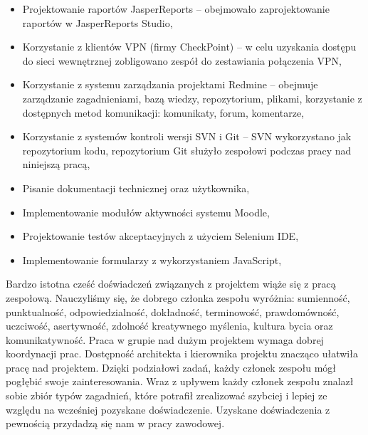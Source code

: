 \begin{itemize}
\item Projektowanie raportów JasperReports -- obejmowało zaprojektowanie raportów w JasperReports Studio,
\item Korzystanie z klientów VPN (firmy CheckPoint) -- w celu uzyskania dostępu do sieci wewnętrznej zobligowano zespół do zestawiania połączenia VPN,
\item Korzystanie z systemu zarządzania projektami Redmine -- obejmuje zarządzanie zagadnieniami, bazą wiedzy, repozytorium, plikami, korzystanie z dostępnych metod komunikacji: komunikaty, forum, komentarze,
\item Korzystanie z systemów kontroli wersji SVN i Git -- SVN wykorzystano jak repozytorium kodu, repozytorium Git służyło zespołowi podczas pracy nad niniejszą pracą,
\item Pisanie dokumentacji technicznej oraz użytkownika,
\item Implementowanie modułów aktywności systemu Moodle,
\item Projektowanie testów akceptacyjnych z użyciem Selenium IDE,
\item Implementowanie formularzy z wykorzystaniem JavaScript,
\end{itemize}

Bardzo istotna cześć doświadczeń związanych z projektem wiąże się z pracą zespołową.
Nauczyliśmy się, że dobrego członka zespołu wyróżnia: sumienność, punktualność, odpowiedzialność, dokładność, terminowość, prawdomówność, uczciwość, asertywność, zdolność kreatywnego myślenia, kultura bycia oraz komunikatywność. Praca w grupie nad dużym projektem wymaga dobrej koordynacji prac. Dostępność architekta i kierownika projektu znacząco ułatwiła pracę nad projektem. Dzięki podziałowi zadań, każdy członek zespołu mógł pogłębić swoje zainteresowania. Wraz z upływem każdy członek zespołu znalazł sobie zbiór typów zagadnień, które potrafił zrealizować szybciej i lepiej ze względu na wcześniej pozyskane doświadczenie. Uzyskane doświadczenia z pewnością przydadzą się nam w pracy zawodowej.

